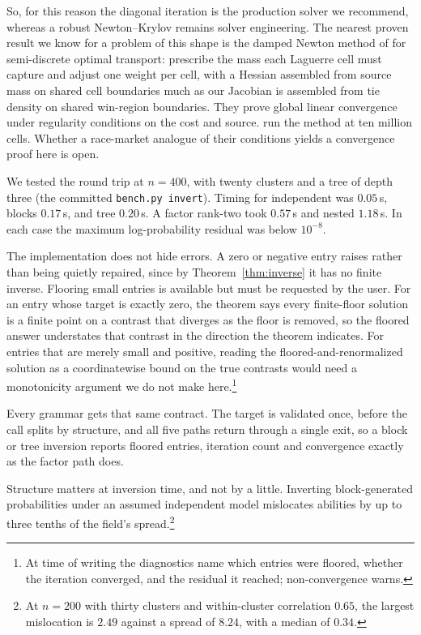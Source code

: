 \documentclass[11pt]{article}
\begin{document}
So, for this reason the diagonal iteration
is the production solver we recommend, whereas a robust Newton--Krylov remains solver
engineering. The nearest
proven result we know for a problem of this shape is the damped Newton
method of \citet{kitagawa2019} for semi-discrete optimal transport:
prescribe the mass each Laguerre cell must capture and adjust one
weight per cell, with a Hessian assembled from source mass on shared
cell boundaries much as our Jacobian is assembled from tie density on
shared win-region boundaries. They prove global linear convergence
under regularity conditions on the cost and source.
\citet{levy2021} run the method at ten million cells. Whether a
race-market analogue of their conditions yields a convergence proof
here is open.

We tested the round trip at $n=400$, with twenty
clusters and a tree of depth three (the committed \texttt{bench.py
invert}). Timing for independent was $0.05$\,s, blocks $0.17$\,s, and tree $0.20$\,s. A factor
rank-two took $0.57$\,s and nested $1.18$\,s. In each case the maximum log-probability residual was below $10^{-8}$.

The implementation does not hide errors. A zero or negative entry raises
rather than being quietly repaired, since by Theorem~\ref{thm:inverse} it
has no finite inverse. Flooring small entries is available but must be
requested by the user. For an entry whose target is exactly zero, the
theorem says every finite-floor solution is a finite point on a contrast
that diverges as the floor is removed, so the floored answer understates
that contrast in the direction the theorem indicates. For entries that
are merely small and positive, reading the floored-and-renormalized
solution as a coordinatewise bound on the true contrasts would need a
monotonicity argument we do not make here.\footnote{At time of writing
the diagnostics name which entries were floored, whether the iteration
converged, and the residual it reached; non-convergence warns.}

Every grammar gets that same contract. The target is validated once,
before the call splits by structure, and all five paths return through a
single exit, so a block or tree inversion reports floored entries,
iteration count and convergence exactly as the factor path does.

Structure matters at inversion time, and not by a little. Inverting
block-generated probabilities under an assumed independent model
mislocates abilities by up to three tenths of the field's spread.\footnote{At
$n=200$ with thirty clusters and within-cluster correlation $0.65$, the
largest mislocation is $2.49$ against a spread of $8.24$, with a median
of $0.34$.}
\end{document}
